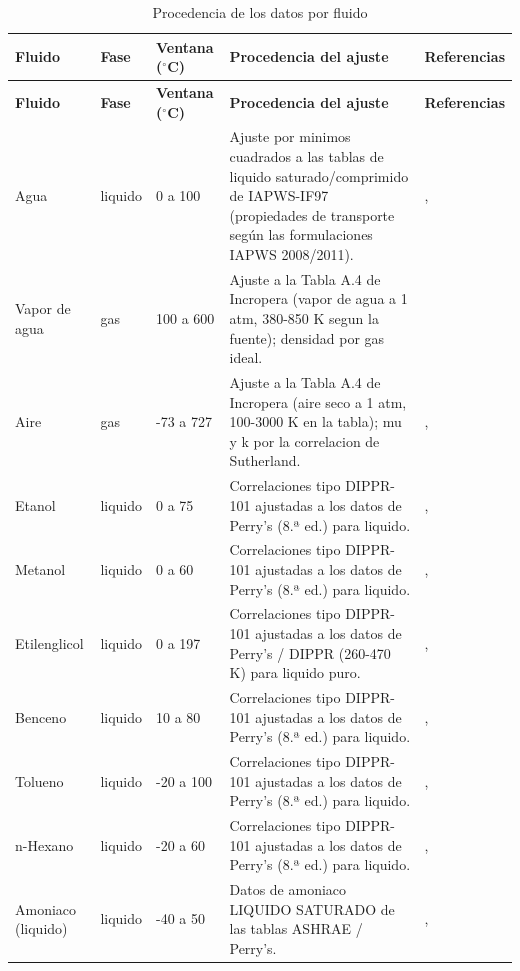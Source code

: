 \documentclass[11pt,a4paper]{article}
\begin{document}
\begin{longtable}{p{2.6cm}l p{1.5cm} p{6.2cm} p{3.4cm}}
\caption{Procedencia de los datos por fluido}\label{tab:fuentes}\\
\toprule
\textbf{Fluido} & \textbf{Fase} & \textbf{Ventana ($^\circ$C)} &
\textbf{Procedencia del ajuste} & \textbf{Referencias} \\
\midrule
\endfirsthead
\toprule
\textbf{Fluido} & \textbf{Fase} & \textbf{Ventana ($^\circ$C)} &
\textbf{Procedencia del ajuste} & \textbf{Referencias} \\
\midrule
\endhead
Agua & liquido & 0 a 100 & Ajuste por minimos cuadrados a las tablas de liquido saturado/comprimido de IAPWS-IF97 (propiedades de transporte según las formulaciones IAPWS 2008/2011). & \cite{iapws-if97}, \cite{iapws-transporte} \\
Vapor de agua & gas & 100 a 600 & Ajuste a la Tabla A.4 de Incropera (vapor de agua a 1 atm, 380-850 K segun la fuente); densidad por gas ideal. & \cite{incropera} \\
Aire & gas & -73 a 727 & Ajuste a la Tabla A.4 de Incropera (aire seco a 1 atm, 100-3000 K en la tabla); mu y k por la correlacion de Sutherland. & \cite{incropera}, \cite{sutherland} \\
Etanol & liquido & 0 a 75 & Correlaciones tipo DIPPR-101 ajustadas a los datos de Perry's (8.ª ed.) para liquido. & \cite{perry}, \cite{dippr} \\
Metanol & liquido & 0 a 60 & Correlaciones tipo DIPPR-101 ajustadas a los datos de Perry's (8.ª ed.) para liquido. & \cite{perry}, \cite{dippr} \\
Etilenglicol & liquido & 0 a 197 & Correlaciones tipo DIPPR-101 ajustadas a los datos de Perry's / DIPPR (260-470 K) para liquido puro. & \cite{perry}, \cite{dippr} \\
Benceno & liquido & 10 a 80 & Correlaciones tipo DIPPR-101 ajustadas a los datos de Perry's (8.ª ed.) para liquido. & \cite{perry}, \cite{dippr} \\
Tolueno & liquido & -20 a 100 & Correlaciones tipo DIPPR-101 ajustadas a los datos de Perry's (8.ª ed.) para liquido. & \cite{perry}, \cite{dippr} \\
n-Hexano & liquido & -20 a 60 & Correlaciones tipo DIPPR-101 ajustadas a los datos de Perry's (8.ª ed.) para liquido. & \cite{perry}, \cite{dippr} \\
Amoniaco (liquido) & liquido & -40 a 50 & Datos de amoniaco LIQUIDO SATURADO de las tablas ASHRAE / Perry's. & \cite{ashrae}, \cite{perry} \\
\bottomrule
\end{longtable}
\end{document}

